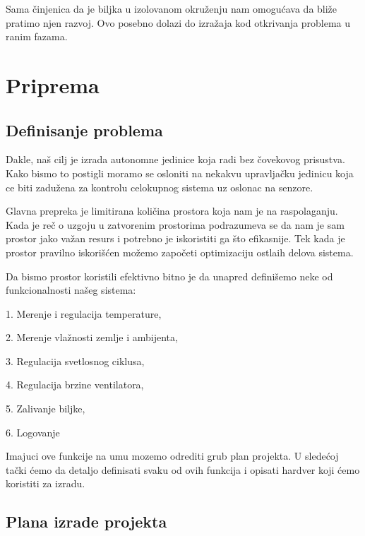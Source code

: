\documentclass[a4paper,11pt]{book}
\makeatletter
\newenvironment{chapquote}[2][2em]
  {\setlength{\@tempdima}{#1}%
   \def\chapquote@author{#2}%
   \parshape 1 \@tempdima \dimexpr\textwidth-2\@tempdima\relax%
   \itshape}
  {\par\normalfont\hfill--\ \chapquote@author\hspace*{\@tempdima}\par\bigskip}
\makeatother
\begin{document}
\noindent Sama činjenica da je biljka u izolovanom okruženju nam omogućava da bliže pratimo njen razvoj. Ovo posebno dolazi do izražaja kod otkrivanja problema u ranim fazama.

\chapter{Priprema}


\section{Definisanje problema}
Dakle, naš cilj je izrada autonomne jedinice koja radi bez čovekovog prisustva. Kako bismo to postigli moramo se osloniti na nekakvu upravljačku jedinicu koja ce biti zadužena za kontrolu celokupnog sistema uz oslonac na senzore. 

Glavna prepreka je limitirana količina prostora koja nam je na raspolaganju. Kada je reč o uzgoju u zatvorenim prostorima podrazumeva se da nam je sam prostor jako važan resurs i potrebno je iskoristiti ga što efikasnije. Tek kada je prostor pravilno iskorišćen možemo započeti optimizaciju ostlaih delova sistema.

Da bismo prostor koristili efektivno bitno je da unapred definišemo neke od funkcionalnosti našeg sistema: 

\hrulefill

1. Merenje i regulacija temperature,

2. Merenje vlažnosti zemlje i ambijenta,

3. Regulacija svetlosnog ciklusa,

4. Regulacija brzine ventilatora,

5. Zalivanje biljke,

6. Logovanje 

\hrulefill

\noindent Imajuci ove funkcije na umu mozemo odrediti grub plan projekta. U sledećoj tački ćemo da detaljo definisati svaku od ovih funkcija i opisati hardver koji ćemo koristiti za izradu.

\section{Plana izrade projekta}
\end{document}
